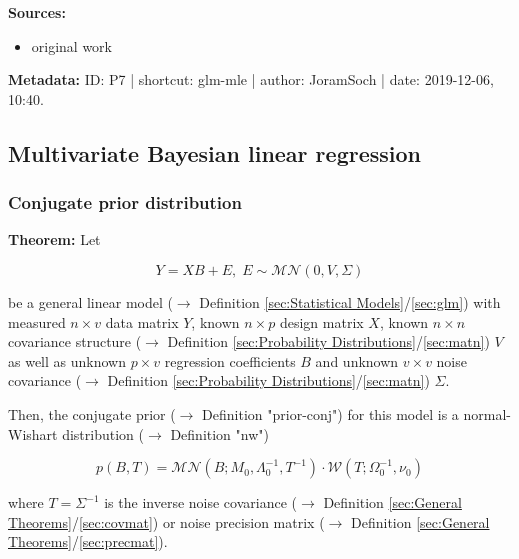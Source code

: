 \documentclass[a4paper,12pt,twoside]{book}
\begin{document}
\vspace{1em}
\textbf{Sources:}
\begin{itemize}
\item original work\end{itemize}


\vspace{1em}
\textbf{Metadata:} ID: P7 | shortcut: glm-mle | author: JoramSoch | date: 2019-12-06, 10:40.
\vspace{1em}



\subsection{Multivariate Bayesian linear regression}

\subsubsection[\textbf{Conjugate prior distribution}]{Conjugate prior distribution} \label{sec:mblr-prior}
\setcounter{equation}{0}

\textbf{Theorem:} Let

\begin{equation} \label{eq:mblr-prior-GLM}
Y = X B + E, \; E \sim \mathcal{MN}(0, V, \Sigma)
\end{equation}

be a general linear model ($\rightarrow$ Definition \ref{sec:Statistical Models}/\ref{sec:glm}) with measured $n \times v$ data matrix $Y$, known $n \times p$ design matrix $X$, known $n \times n$ covariance structure ($\rightarrow$ Definition \ref{sec:Probability Distributions}/\ref{sec:matn}) $V$ as well as unknown $p \times v$ regression coefficients $B$ and unknown $v \times v$ noise covariance ($\rightarrow$ Definition \ref{sec:Probability Distributions}/\ref{sec:matn}) $\Sigma$.

Then, the conjugate prior ($\rightarrow$ Definition "prior-conj") for this model is a normal-Wishart distribution ($\rightarrow$ Definition "nw")

\begin{equation} \label{eq:mblr-prior-GLM-NW-prior}
p(B,T) = \mathcal{MN}(B; M_0, \Lambda_0^{-1}, T^{-1}) \cdot \mathcal{W}(T; \Omega_0^{-1}, \nu_0)
\end{equation}

where $T = \Sigma^{-1}$ is the inverse noise covariance ($\rightarrow$ Definition \ref{sec:General Theorems}/\ref{sec:covmat}) or noise precision matrix ($\rightarrow$ Definition \ref{sec:General Theorems}/\ref{sec:precmat}).
\end{document}
